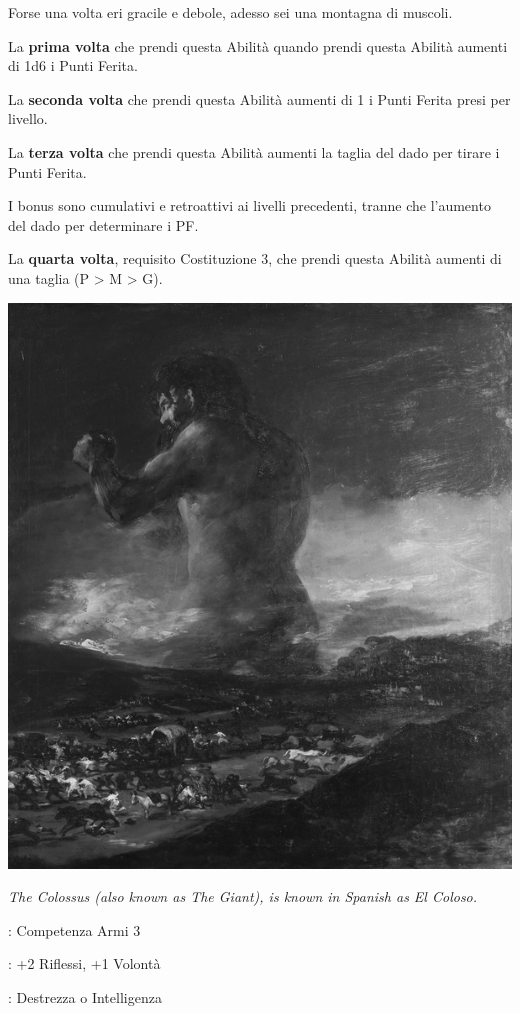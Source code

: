 \begin{multicols}{2}
Forse una volta eri gracile e debole, adesso sei una montagna di muscoli.

La \textbf{prima volta} che prendi questa Abilità quando prendi questa Abilità aumenti di 1d6 i Punti Ferita.

La \textbf{seconda volta} che prendi questa Abilità aumenti di 1 i Punti Ferita presi per livello.

La \textbf{terza volta} che prendi questa Abilità aumenti la taglia del dado per tirare i Punti Ferita.

I bonus sono cumulativi e retroattivi ai livelli precedenti, tranne che l'aumento del dado per determinare i PF.

La \textbf{quarta volta}, requisito Costituzione 3, che prendi questa Abilità aumenti di una taglia (P > M > G).


\begin{center}
	\includegraphics[width=0.65\linewidth]{immagini/elcolosso.png}

	\emph{The Colossus (also known as The Giant), is known in Spanish as El Coloso.}
\end{center}


\begin{description}[noitemsep, topsep=0pt, parsep=0pt, partopsep=0pt, leftmargin=0cm, labelwidth=2.5cm]
    \item[\textbf{Requisito}]: Competenza Armi 3
    \item[\textbf{Tiri Salvezza}]: +2 Riflessi, +1 Volontà
    \item[\textbf{Caratteristica}]: Destrezza o Intelligenza
\end{description}


\end{multicols}

